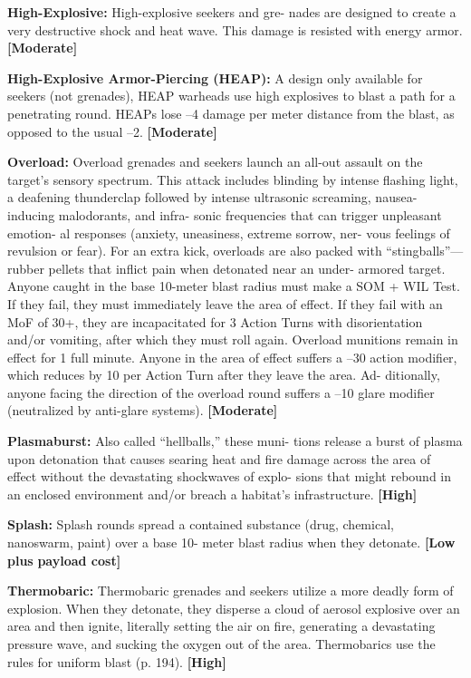 \textbf{High-Explosive:  }High-explosive seekers and gre-
nades are designed to create a very destructive shock 
and heat wave. This damage is resisted with energy 
armor. \textbf{[Moderate]}

\textbf{High-Explosive Armor-Piercing (HEAP):} A design 
only available for seekers (not grenades), HEAP 
warheads use high explosives to blast a path for 
a penetrating round. HEAPs lose –4 damage per 
meter distance from the blast, as opposed to the 
usual –2. \textbf{[Moderate]}

\textbf{Overload:} Overload grenades and seekers launch an 
all-out assault on the target's sensory spectrum. This 
attack includes blinding by intense flashing light, a 
deafening thunderclap followed by intense ultrasonic 
screaming, nausea-inducing malodorants, and infra-
sonic frequencies that can trigger unpleasant emotion-
al responses (anxiety, uneasiness, extreme sorrow, ner-
vous feelings of revulsion or fear). For an extra kick, 
overloads are also packed with ``stingballs''—rubber 
pellets that inflict pain when detonated near an under-
armored target. Anyone caught in the base 10-meter 
blast radius must make a SOM + WIL Test. If they fail, 
they must immediately leave the area of effect. If they 
fail with an MoF of 30+, they are incapacitated for 
3 Action Turns with disorientation and/or vomiting, 
after which they must roll again. Overload munitions 
remain in effect for 1 full minute. Anyone in the area 
of effect suffers a –30 action modifier, which reduces 
by 10 per Action Turn after they leave the area. Ad-
ditionally, anyone facing the direction of the overload 
round suffers a –10 glare modifier (neutralized by 
anti-glare systems). \textbf{[Moderate]}

\textbf{Plasmaburst:} Also called ``hellballs,'' these muni-
tions release a burst of plasma upon detonation that 
causes searing heat and fire damage across the area of 
effect without the devastating shockwaves of explo-
sions that might rebound in an enclosed environment 
and/or breach a habitat's infrastructure. \textbf{[High]}

\textbf{Splash:} Splash rounds spread a contained substance 
(drug, chemical, nanoswarm, paint) over a base 10-
meter blast radius when they detonate. \textbf{[Low plus }
\textbf{payload cost]}

\textbf{Thermobaric:} Thermobaric grenades and seekers 
utilize a more deadly form of explosion. When they 
detonate, they disperse a cloud of aerosol explosive 
over an area and then ignite, literally setting the air 
on fire, generating a devastating pressure wave, and 
sucking the oxygen out of the area. Thermobarics use 
the rules for uniform blast (p. 194). \textbf{[High]}

